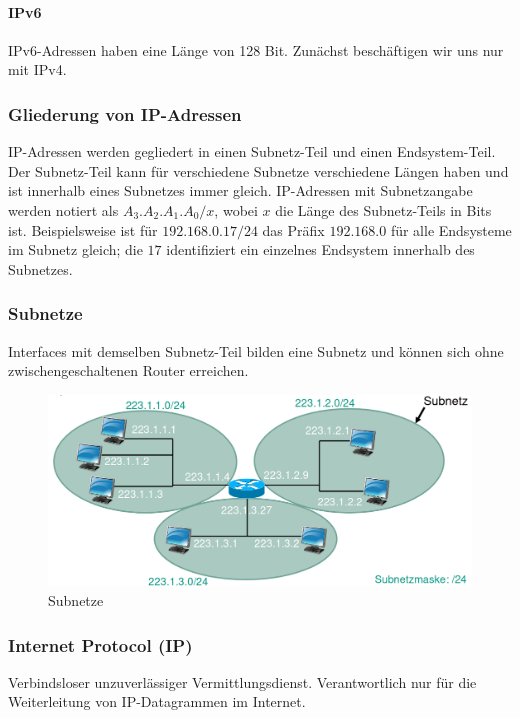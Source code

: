 \documentclass[a4paper, 14pt]{article}
\begin{document}
	\paragraph{IPv6}

	IPv6-Adressen haben eine Länge von 128 Bit.
	Zunächst beschäftigen wir uns nur mit IPv4.

	\subsubsection{Gliederung von IP-Adressen}

	IP-Adressen werden gegliedert in einen Subnetz-Teil und einen Endsystem-Teil.
	Der Subnetz-Teil kann für verschiedene Subnetze verschiedene Längen haben und ist innerhalb eines Subnetzes immer gleich.
	IP-Adressen mit Subnetzangabe werden notiert als $A_3.A_2.A_1.A_0/x$, wobei $x$ die Länge des Subnetz-Teils in Bits ist.
	Beispielsweise ist für $192.168.0.17/24$ das Präfix $192.168.0$ für alle Endsysteme im Subnetz gleich; die $17$ identifiziert ein einzelnes Endsystem innerhalb des Subnetzes.

	\subsubsection{Subnetze}

	Interfaces mit demselben Subnetz-Teil bilden eine Subnetz und können sich ohne zwischengeschaltenen Router erreichen.

	\begin{figure}
		\includegraphics[width=\textwidth]{images/05-subnets.png}
		\caption{Subnetze}
	\end{figure}

	\subsubsection{Internet Protocol (IP)}

	Verbindsloser unzuverlässiger Vermittlungsdienst.
	Verantwortlich nur für die Weiterleitung von IP-Datagrammen im Internet.
	
\end{document}
